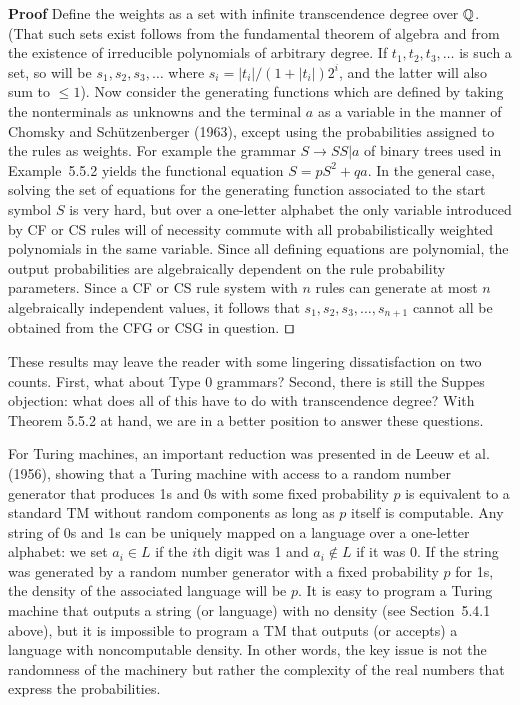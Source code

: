 \smallskip
\noindent
{\bf Proof} 
Define the weights as a set with infinite transcendence degree over ${\Bbb
Q}$.  (That such sets exist follows from the fundamental theorem of algebra
and from the existence of irreducible polynomials of arbitrary degree.  If
$t_1, t_2, t_3, \ldots$ is such a set, so will be $s_1, s_2, s_3, \ldots$
where $s_i=|t_i|/(1+|t_i|)2^i$, and the latter will also sum to $\leq 1$). Now
consider the generating functions which are defined by taking the nonterminals
as unknowns and the terminal $a$ as a variable in the manner of Chomsky and
Sch\"utzenberger (1963), except using the probabilities assigned to the rules
as weights. For example the grammar $S \rightarrow SS | a$ of binary trees
used in Example~5.5.2 yields the functional equation $S=pS^2+qa$.  In the
general case, solving the set of equations for the generating function
associated to the start symbol $S$ is very hard, but \nocite{Chomsky:1963}
over a one-letter alphabet the only variable introduced by CF or CS rules will
of necessity commute with all probabilistically weighted polynomials in the
same variable. Since all defining equations are polynomial, the output
probabilities are algebraically dependent on the rule probability parameters.
Since a CF or CS rule system with $n$ rules can generate at most $n$
algebraically independent values, it follows that $s_1, s_2, s_3, \ldots,
s_{n+1}$ cannot all be obtained from the CFG or CSG in question. $\qed$

These results may leave the reader with some lingering dissatisfaction on two
counts. First, what about Type 0 grammars? Second, there is still the Suppes
objection: what does all of this have to do with transcendence degree? With
Theorem 5.5.2 at hand, we are in a better position to answer these questions.

For Turing machines, an important reduction was presented in de Leeuw et al.
(1956), showing\nocite{Leeuw:1956} that a Turing machine with access to a
random number generator that produces 1s and 0s with some fixed probability
$p$ is equivalent to a standard TM without random components as long as $p$
itself is computable. Any string of 0s and 1s can be uniquely mapped on a
language over a one-letter alphabet: we set $a_i \in L$ if the $i$th digit was
1 and $a_i \not\in L$ if it was 0.  If the string was generated by a random
number generator with a fixed probability $p$ for 1s, the density of the
associated language will be $p$.  It is easy to program a Turing machine that
outputs a string (or language) with no density (see Section~5.4.1 above), but
it is impossible to program a TM that outputs (or accepts) a language with
noncomputable density. In other words, the key issue is not the randomness of
the machinery but rather the complexity of the real numbers that express the
probabilities.

